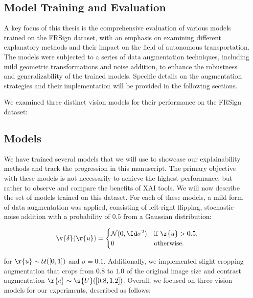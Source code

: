 \subsection{Model Training and Evaluation}

A key focus of this thesis is the comprehensive evaluation of various models trained on the FRSign dataset, with an emphasis on examining different explanatory methods and their impact on the field of autonomous transportation. The models were subjected to a series of data augmentation techniques, including mild geometric transformations and noise addition, to enhance the robustness and generalizability of the trained models. Specific details on the augmentation strategies and their implementation will be provided in the following sections.

We examined three distinct vision models for their performance on the FRSign dataset:

\subsection{Models}

We have trained several models that we will use to showcase our explainability methods and track the progression in this manuscript. The primary objective with these models is not necessarily to achieve the highest performance, but rather to observe and compare the benefits of XAI tools. We will now describe the set of models trained on this dataset. For each of these models, a mild form of data augmentation was applied, consisting of left-right flipping, stochastic noise addition with a probability of $0.5$ from a Gaussian distribution:

\[
\v{\delta}(\r{u}) = 
\begin{cases} 
\mathcal{N}(0, \Id\sigma^2) & \text{if } \r{u} > 0.5, \\
0 & \text{otherwise}.
\end{cases}
\]

for $\r{u} \sim \mathcal{U}([0,1])$ and $\sigma = 0.1$. Additionally, we implemented slight cropping augmentation that crops from $0.8$ to $1.0$ of the original image size and contrast augmentation $\r{c} \sim \s{U}([0.8, 1.2])$. Overall, we focused on three vision models for our experiments, described as follows:

